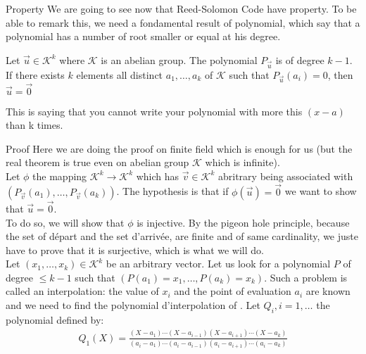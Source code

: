 \begin{parag}{Property}
    We are going to see now that Reed-Solomon Code have  property. To be able to remark this, we need a fondamental result of polynomial, which say that a polynomial has a number of root smaller or equal at his degree.
    \begin{theoreme}
        Let $\vec{u} \in \mathcal{K}^k$ where $\mathcal{K}$ is an abelian group. The polynomial $P_{\vec{u}}$ is of degree $k-1$. If there exists $k$ elements all distinct $a_1, \ldots, a_k$ of $\mathcal{K}$ such that $P_{\vec{u}}\left(a_i\right) = 0$, then $\vec{u}= \vec{0}$
    \end{theoreme}
    This is saying that you cannot write your polynomial with more this $\left(x-a\right)$ than k times.
    \begin{subparag}{Proof}
        Here we are doing the proof on finite field which is enough for us (but the real theorem is true even on abelian group $\mathcal{K}$ which is infinite). \\
        Let $\phi$ the mapping $\mathcal{K}^k \to \mathcal{K}^k$ which has $\vec{v} \in \mathcal{K}^k$ abritrary being associated with $\left(P_{\vec{v}}\left(a_1\right), \ldots, P_{\vec{v}}\left(a_k\right)\right)$. The hypothesis is that if $\phi \left(\vec{u}\right) =  \vec{0}$ we want to show that $\vec{u}= \vec{0}$.\\
        To do so, we will show that $\phi$ is injective. By the pigeon hole principle, because the set of départ and the set d'arrivée, are finite and of same cardinality, we juste have to prove that it is surjective, which is what we will do.\\
        Let $\left(x_1, \ldots, x_k\right) \in \mathcal{K}^k$  be an arbitrary vector. Let us look for a polynomial $P$ of degree $\leq k-1$ such that $\left(P\left(a_1\right) = x_1, \ldots, P\left(a_k\right) =  x_k\right)$. Such a problem is called an interpolation: the value of $x_i$ and the point of evaluation $a_i$ are known and we need to find the polynomial d'interpolation of . Let $Q_i, i = 1, \ldots$ the polynomial defined by:
        \begin{align*} 
            Q_1\left(X\right) =  \frac{\left(X-a_1\right)\cdots\left(X-a_{i-1}\right)\left(X-a_{i+1}\right)\cdots\left(X-a_k\right)}{\left(a_i - a_1\right)\cdots\left(a_i - a_{i-1}\right)\left(a_i-a_{i+1}\right)\cdots\left(a_i-a_k\right)}
        \end{align*}
        \begin{framedremark}

\end{framedremark}
\end{subparag}
\end{parag}
